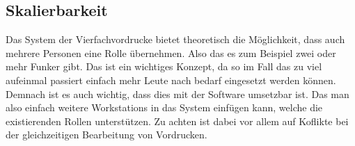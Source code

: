 \subsection{Skalierbarkeit}
Das System der Vierfachvordrucke bietet theoretisch die Möglichkeit, dass auch mehrere Personen eine Rolle übernehmen. Also das es zum Beispiel zwei oder mehr Funker gibt. Das ist ein wichtiges Konzept, da so im Fall das zu viel aufeinmal passiert einfach mehr Leute nach bedarf eingesetzt werden können. Demnach ist es auch wichtig, dass dies mit der Software umsetzbar ist. Das man also einfach weitere Workstations in das System einfügen kann, welche die existierenden Rollen unterstützen. Zu achten ist dabei vor allem auf Koflikte bei der gleichzeitigen Bearbeitung von Vordrucken.
